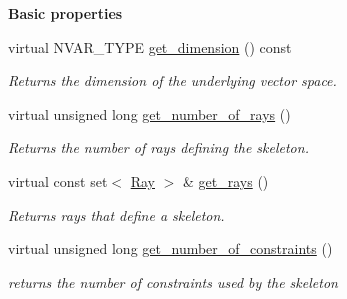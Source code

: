 \begin{Indent}\textbf{ Basic properties}\par
\begin{DoxyCompactItemize}
\item 
\mbox{\label{group___c_l_s_solvers_a80092baf21b7c03891f5b326a6782e52}} 
virtual N\+V\+A\+R\+\_\+\+T\+Y\+PE \hyperlink{group___c_l_s_solvers_a80092baf21b7c03891f5b326a6782e52}{get\+\_\+dimension} () const
\begin{DoxyCompactList}\small\item\em Returns the dimension of the underlying vector space. \end{DoxyCompactList}\item 
\mbox{\label{group___c_l_s_solvers_af10b4e8c079af45803e7e76f8d00d04d}} 
virtual unsigned long \hyperlink{group___c_l_s_solvers_af10b4e8c079af45803e7e76f8d00d04d}{get\+\_\+number\+\_\+of\+\_\+rays} ()
\begin{DoxyCompactList}\small\item\em Returns the number of rays defining the skeleton. \end{DoxyCompactList}\item 
virtual const set$<$ \hyperlink{group___c_l_s_solvers_class_l_p___solvers_1_1_ray}{Ray} $>$ \& \hyperlink{group___c_l_s_solvers_ae011960777ca5e09d8c2b24c6ff66367}{get\+\_\+rays} ()
\begin{DoxyCompactList}\small\item\em Returns rays that define a skeleton. \end{DoxyCompactList}\item 
virtual unsigned long \hyperlink{group___c_l_s_solvers_acf743e235ac0476d8d739b139f76a0af}{get\+\_\+number\+\_\+of\+\_\+constraints} ()
\begin{DoxyCompactList}\small\item\em returns the number of constraints used by the skeleton \end{DoxyCompactList}\end{DoxyCompactItemize}
\end{Indent}
